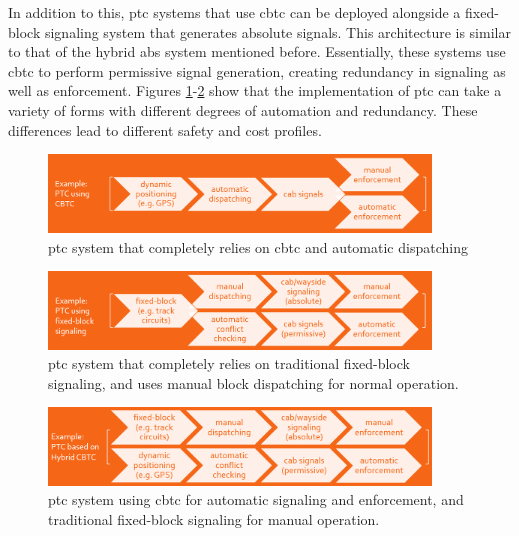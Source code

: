 \documentclass[11pt, titlepage]{article}
\begin{document}
In addition to this, \gls{ptc} systems that use \gls{cbtc} can be deployed alongside
a fixed-block signaling system that generates absolute signals. This architecture is
similar to that of the hybrid \gls{abs} system mentioned before. Essentially, these
systems use \gls{cbtc} to perform permissive signal generation, creating redundancy
in signaling as well as enforcement. Figures \ref{PTCwithCBTC}-\ref{PTCHybridCBTC}
show that the implementation of \gls{ptc} can take a variety of forms with
different degrees of automation and redundancy. These differences lead to different
safety and cost profiles.

\begin{figure}[ht]
    \begin{center}
        \includegraphics[width=4in]{PTCwithCBTC.png}
        \caption{\gls{ptc} system that completely relies on \gls{cbtc} and automatic
        dispatching}
        \label{PTCwithCBTC}
    \end{center}
\end{figure}

\begin{figure}[ht]
    \begin{center}
        \includegraphics[width=4in]{FixedBlockPTC.png}
        \captionsetup{justification=centering}
        \caption{\gls{ptc} system that completely relies on traditional fixed-block
        signaling, and uses manual block dispatching for normal operation.}
    \end{center}
\end{figure}

\begin{figure}[ht]
    \begin{center}
        \includegraphics[width=4in]{PTCHybridCBTC.png}
        \captionsetup{justification=centering}
        \caption{\gls{ptc} system using \gls{cbtc} for automatic signaling and
        enforcement, and traditional fixed-block signaling for manual operation.}
        \label{PTCHybridCBTC}
    \end{center}
\end{figure}
\end{document}
